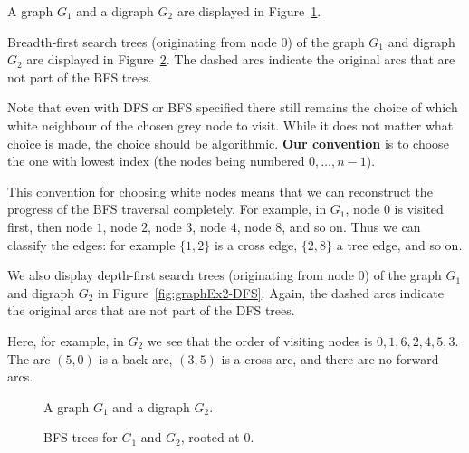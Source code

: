 \begin{Example}
\label{eg:graphExample2}

A graph $G_1$ and a digraph $G_2$ are displayed in
Figure~\ref{fig:graphExample2}.

Breadth-first search trees (originating from node $0$) of the graph
$G_1$ and digraph $G_2$  are displayed
in Figure~\ref{fig:graphEx2-BFS}. The dashed arcs indicate the original arcs that are not part of the BFS trees.

Note that even with DFS or BFS specified there still remains the choice
of which white neighbour of the chosen grey node to visit. While it does
not matter what choice is made, the choice should be algorithmic.
\textbf{Our convention} is to choose the one with
lowest index (the nodes being numbered $0, \dots, n - 1$). 

This convention for choosing white nodes means that we can
reconstruct the progress of the BFS traversal completely. For example,
in $G_1$, node $0$ is visited first, then node $1$, node $2$, node $3$,
node $4$, node $8$, and so on. Thus we can classify the
edges: for example $\{1, 2\}$ is a cross edge, $\{2, 8\}$ a tree edge,
and so on.

We also display depth-first search trees (originating from node $0$) of
the graph $G_1$ and digraph $G_2$ in Figure~\ref{fig:graphEx2-DFS}.
Again, the dashed arcs indicate the original arcs that are not part of
the DFS trees.

Here, for example, in $G_2$ we see that the order of visiting nodes is 
$0, 1, 6, 2, 4, 5, 3$. The arc $(5, 0)$ is a back arc, $(3, 5)$ is a
cross arc, and there are no forward arcs.

\end{Example}

\begin{figure}[hbtp]


\medskip

\centerline{}

\caption{A graph $G_1$ and a digraph $G_2$.}
\label{fig:graphExample2}

\end{figure}

\begin{figure}[hbtp]

\medskip

\centerline{}

\caption{BFS trees for $G_1$ and $G_2$, rooted at $0$.}
\label{fig:graphEx2-BFS}

\end{figure}

